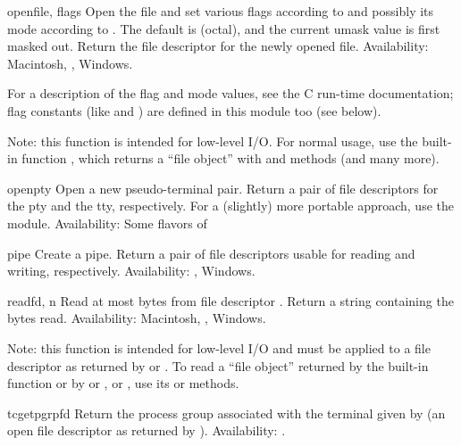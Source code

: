 \begin{funcdesc}{open}{file, flags}
Open the file  and set various flags according to
 and possibly its mode according to .
The default  is  (octal), and the current umask
value is first masked out.  Return the file descriptor for the newly
opened file.
Availability: Macintosh, \UNIX{}, Windows.

For a description of the flag and mode values, see the C run-time
documentation; flag constants (like  and
) are defined in this module too (see below).

Note: this function is intended for low-level I/O.  For normal usage,
use the built-in function , which returns a ``file
object'' with  and  methods (and many
more).
\end{funcdesc}

\begin{funcdesc}{openpty}{}
Open a new pseudo-terminal pair. Return a pair of file descriptors
 for the pty and the tty,
respectively. For a (slightly) more portable approach, use the
 module.
Availability: Some flavors of \UNIX{}
\end{funcdesc}

\begin{funcdesc}{pipe}{}
Create a pipe.  Return a pair of file descriptors  usable for reading and writing, respectively.
Availability: \UNIX{}, Windows.
\end{funcdesc}

\begin{funcdesc}{read}{fd, n}
Read at most  bytes from file descriptor .
Return a string containing the bytes read.
Availability: Macintosh, \UNIX{}, Windows.

Note: this function is intended for low-level I/O and must be applied
to a file descriptor as returned by  or
.  To read a ``file object'' returned by the
built-in function  or by  or
, or , use its
 or  methods.
\end{funcdesc}

\begin{funcdesc}{tcgetpgrp}{fd}
Return the process group associated with the terminal given by
 (an open file descriptor as returned by ).
Availability: \UNIX{}.
\end{funcdesc}

